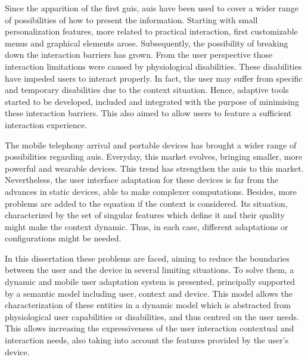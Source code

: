 




\begin{abstracts}        %
Since the apparition of the first \acp{gui}, \acp{aui} have been used to cover
a wider range of possibilities of how to present the information. Starting 
with small personalization features, more related to practical interaction, 
first customizable menus and graphical elements arose. Subsequently, the 
possibility of breaking down the interaction barriers has grown. From the user
perspective those interaction limitations were caused by physiological disabilities.
These disabilities have impeded users to interact properly. In fact, the user may 
suffer from specific and temporary disabilities due to the context situation. 
Hence, adaptive tools started to be developed, included and integrated with the 
purpose of minimising these interaction barriers. This also aimed to allow users 
to feature a sufficient interaction experience.

The mobile telephony arrival and portable devices has brought a wider range of
possibilities regarding \acp{aui}. Everyday, this market evolves, bringing
smaller, more powerful and wearable devices. This trend has strengthen the \acp{aui}
to this market. Nevertheless, the user interface adaptation for these devices
is far from the advances in static devices, able to make complexer computations. 
Besides, more problems are added to the equation if the context is considered.
Its situation, characterized by the set of singular features which define it 
and their quality might make the context dynamic. Thus, in each case, different 
adaptations or configurations might be needed. 

In this dissertation these problems are faced, aiming to reduce the boundaries
between the user and the device in several limiting situations. To solve them, 
a dynamic and mobile user adaptation system is presented, principally supported 
by a semantic model including user, context and device. This model allows the 
characterization of these entities in a dynamic model which is abstracted from 
physiological user capabilities or disabilities, and thus centred on the user 
needs. This allows increasing the expressiveness of the user interaction 
contextual and interaction needs, also taking into account the features provided 
by the user's device.


\end{abstracts}

